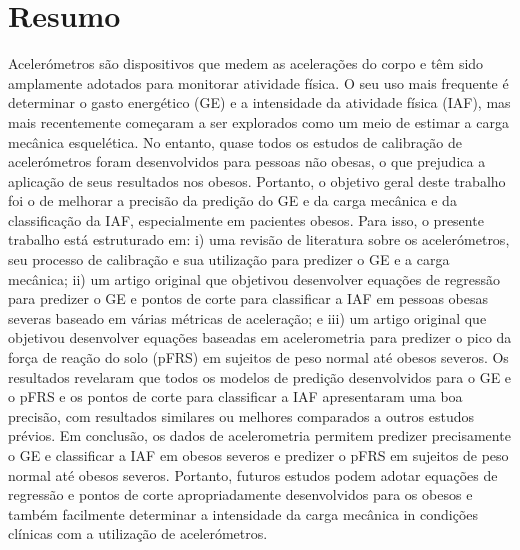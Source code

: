 \documentclass[12pt]{article}
\def\blankpage{%
      \clearpage%
      \thispagestyle{empty}%
      \addtocounter{page}{+0}%
      \null%
      \clearpage}
\begin{document}

\renewcommand{\contentsname}{\centerline{\bfseries\Large Table of Contents \vspace{1em}}}
\tableofcontents
\blankpage

\renewcommand{\listfigurename}{\centerline{\bfseries\Large List of figures \vspace{1em}}}
\listoffigures
{}
\blankpage

\section*{\hfil Resumo \hfil}
\vspace{0.5em}

\noindent Acelerómetros são dispositivos que medem as acelerações do corpo e têm sido amplamente adotados para monitorar atividade física. O seu uso mais frequente é determinar o gasto energético (GE) e a intensidade da atividade física (IAF), mas mais recentemente começaram a ser explorados como um meio de estimar a carga mecânica esquelética. No entanto, quase todos os estudos de calibração de acelerómetros foram desenvolvidos para pessoas não obesas, o que prejudica a aplicação de seus resultados nos obesos. Portanto, o objetivo geral deste trabalho foi o de melhorar a precisão da predição do GE e da carga mecânica e da classificação da IAF, especialmente em pacientes obesos. Para isso, o presente trabalho está estruturado em: i) uma revisão de literatura sobre os acelerómetros, seu processo de calibração e sua utilização para predizer o GE e a carga mecânica; ii) um artigo original que objetivou desenvolver equações de regressão para predizer o GE e pontos de corte para classificar a IAF em pessoas obesas severas baseado em várias métricas de aceleração; e iii) um artigo original que objetivou desenvolver equações baseadas em acelerometria para predizer o pico da força de reação do solo (pFRS) em sujeitos de peso normal até obesos severos. Os resultados revelaram que todos os modelos de predição desenvolvidos para o GE e o pFRS e os pontos de corte para classificar a IAF apresentaram uma boa precisão, com resultados similares ou melhores comparados a outros estudos prévios. Em conclusão, os dados de acelerometria permitem predizer precisamente o GE e classificar a IAF em obesos severos e predizer o pFRS em sujeitos de peso normal até obesos severos. Portanto, futuros estudos podem adotar equações de regressão e pontos de corte apropriadamente desenvolvidos para os obesos e também facilmente determinar a intensidade da carga mecânica in condições clínicas com a utilização de acelerómetros.
\end{document}
